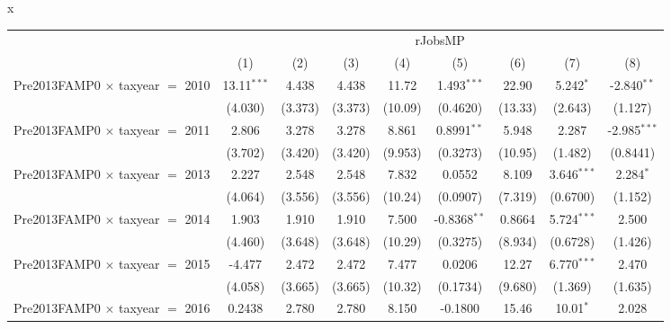 x
\begingroup
\centering
\begin{tabular}{lcccccccc}
   \toprule
    & \multicolumn{8}{c}{rJobsMP}\\
                                           & (1)           & (2)           & (3)           & (4)           & (5)            & (6)           & (7)           & (8)\\  
   \midrule 
   Pre2013FAMP0 $\times$ taxyear $=$ 2010  & 13.11$^{***}$ & 4.438         & 4.438         & 11.72         & 1.493$^{***}$  & 22.90         & 5.242$^{*}$   & -2.840$^{**}$\\   
                                           & (4.030)       & (3.373)       & (3.373)       & (10.09)       & (0.4620)       & (13.33)       & (2.643)       & (1.127)\\   
   Pre2013FAMP0 $\times$ taxyear $=$ 2011  & 2.806         & 3.278         & 3.278         & 8.861         & 0.8991$^{**}$  & 5.948         & 2.287         & -2.985$^{***}$\\   
                                           & (3.702)       & (3.420)       & (3.420)       & (9.953)       & (0.3273)       & (10.95)       & (1.482)       & (0.8441)\\   
   Pre2013FAMP0 $\times$ taxyear $=$ 2013  & 2.227         & 2.548         & 2.548         & 7.832         & 0.0552         & 8.109         & 3.646$^{***}$ & 2.284$^{*}$\\   
                                           & (4.064)       & (3.556)       & (3.556)       & (10.24)       & (0.0907)       & (7.319)       & (0.6700)      & (1.152)\\   
   Pre2013FAMP0 $\times$ taxyear $=$ 2014  & 1.903         & 1.910         & 1.910         & 7.500         & -0.8368$^{**}$ & 0.8664        & 5.724$^{***}$ & 2.500\\   
                                           & (4.460)       & (3.648)       & (3.648)       & (10.29)       & (0.3275)       & (8.934)       & (0.6728)      & (1.426)\\   
   Pre2013FAMP0 $\times$ taxyear $=$ 2015  & -4.477        & 2.472         & 2.472         & 7.477         & 0.0206         & 12.27         & 6.770$^{***}$ & 2.470\\   
                                           & (4.058)       & (3.665)       & (3.665)       & (10.32)       & (0.1734)       & (9.680)       & (1.369)       & (1.635)\\   
   Pre2013FAMP0 $\times$ taxyear $=$ 2016  & 0.2438        & 2.780         & 2.780         & 8.150         & -0.1800        & 15.46         & 10.01$^{*}$   & 2.028\\   

\end{tabular}
